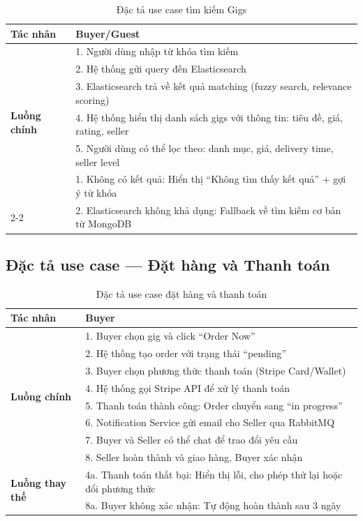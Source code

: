 \documentclass[12pt]{extreport}
\begin{document}
\begin{table}[H]
\centering
\begin{tabular}{|p{4cm}|p{10cm}|}
\hline
\textbf{Tác nhân} & Buyer/Guest \\ \hline
\multirow{6}{*}{\textbf{Luồng chính}} &
1. Người dùng nhập từ khóa tìm kiếm \\ \cline{2-2}
& 2. Hệ thống gửi query đến Elasticsearch \\ \cline{2-2}
& 3. Elasticsearch trả về kết quả matching (fuzzy search, relevance scoring) \\ \cline{2-2}
& 4. Hệ thống hiển thị danh sách gigs với thông tin: tiêu đề, giá, rating, seller \\ \cline{2-2}
& 5. Người dùng có thể lọc theo: danh mục, giá, delivery time, seller level \\ \hline
\multirow{2}{*}{\textbf{Luồng thay thế}} &
1. Không có kết quả: Hiển thị ``Không tìm thấy kết quả'' + gợi ý từ khóa \\ \cline{2-2}
& 2. Elasticsearch không khả dụng: Fallback về tìm kiếm cơ bản từ MongoDB \\ \hline
\end{tabular}
\caption{Đặc tả use case tìm kiếm Gigs}
\label{tab:uc_search}
\end{table}

\subsection{Đặc tả use case --- Đặt hàng và Thanh toán}

\begin{table}[H]
\centering
\begin{tabular}{|p{4cm}|p{10cm}|}
\hline
\textbf{Tác nhân} & Buyer \\ \hline
\multirow{8}{*}{\textbf{Luồng chính}} &
1. Buyer chọn gig và click ``Order Now'' \\ \cline{2-2}
& 2. Hệ thống tạo order với trạng thái ``pending'' \\ \cline{2-2}
& 3. Buyer chọn phương thức thanh toán (Stripe Card/Wallet) \\ \cline{2-2}
& 4. Hệ thống gọi Stripe API để xử lý thanh toán \\ \cline{2-2}
& 5. Thanh toán thành công: Order chuyển sang ``in progress'' \\ \cline{2-2}
& 6. Notification Service gửi email cho Seller qua RabbitMQ \\ \cline{2-2}
& 7. Buyer và Seller có thể chat để trao đổi yêu cầu \\ \cline{2-2}
& 8. Seller hoàn thành và giao hàng, Buyer xác nhận \\ \hline
\multirow{2}{*}{\textbf{Luồng thay thế}} &
4a. Thanh toán thất bại: Hiển thị lỗi, cho phép thử lại hoặc đổi phương thức \\ \cline{2-2}
& 8a. Buyer không xác nhận: Tự động hoàn thành sau 3 ngày \\ \hline
\end{tabular}
\caption{Đặc tả use case đặt hàng và thanh toán}
\label{tab:uc_order}
\end{table}
\end{document}
